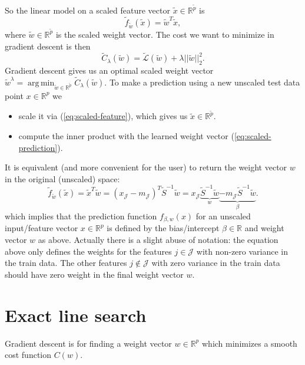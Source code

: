 \documentclass{article}
\DeclareMathOperator*{\argmin}{arg\,min}
\begin{document}
So the linear model on a scaled feature vector
$\tilde x\in\mathbb R^{\tilde p}$ is
\begin{equation}
  \label{eq:scaled-prediction}
  \tilde f_{\tilde w}(\tilde x)=\tilde w^T \tilde x,
\end{equation}
 where
$\tilde w\in\mathbb R^{\tilde p}$ is the scaled weight vector.
The cost we want to minimize in gradient descent is then
\begin{equation}
  \label{eq:scaled-cost}
  \tilde C_\lambda( \tilde w) = \tilde{ \mathcal L}(\tilde w) + \lambda ||\tilde w||_2^2.
\end{equation}
Gradient descent gives us an optimal scaled weight vector
$\tilde w^\lambda = \argmin_{\tilde w\in\mathbb R^{\tilde p}} \tilde
C_\lambda(\tilde w)$. To make a prediction using a new unscaled test
data point $x\in\mathbb R^p$ we
\begin{itemize}
\item scale it via (\ref{eq:scaled-feature}), which gives us
  $\tilde x\in\mathbb R^{\tilde p}$.
\item compute the inner product with the learned weight vector (\ref{eq:scaled-prediction}).
\end{itemize}

It is equivalent (and more convenient for the user) to return the
weight vector $w$ in the original (unscaled) space:
\begin{equation}
  \tilde f_{\tilde w}(\tilde x) = \tilde x^T \tilde w = 
(x_{\mathcal J}-m_{\mathcal J})^T \tilde S^{-1}\tilde w = 
x_{\mathcal J} \underbrace{\tilde S^{-1} \tilde w}_w
\underbrace{-m_{\mathcal J} \tilde S^{-1} \tilde w}_{\beta}.
\end{equation}
which implies that the prediction function $f_{\beta,w}(x)$ for an
unscaled input/feature vector $x\in\mathbb R^p$ is defined by the
bias/intercept $\beta\in\mathbb R$ and weight vector $w$ as
above. Actually there is a slight abuse of notation: the equation
above only defines the weights for the features $j\in\mathcal J$ with
non-zero variance in the train data. The other features
$j\not\in\mathcal J$ with zero variance in the train data should have
zero weight in the final weight vector $w$.

\section{Exact line search}

Gradient descent is for finding a weight vector $w\in\mathbb R^p$
which minimizes a smooth cost function $C(w)$.
\end{document}
